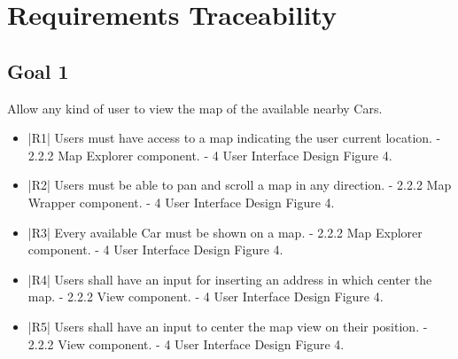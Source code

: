 \section{Requirements Traceability}

\subsection {Goal 1} Allow any kind of user to view the map of the available nearby Cars.
\begin{itemize}
 \item |R1| Users must have access to a map indicating the user current location.
    \newline - 2.2.2 Map Explorer component.
    \newline - 4 User Interface Design Figure 4.
 \item |R2| Users must be able to pan and scroll a map in any direction.
    \newline - 2.2.2 Map Wrapper component.
    \newline - 4 User Interface Design Figure 4.
 \item |R3| Every available Car must be shown on a map.
     \newline - 2.2.2 Map Explorer component.
     \newline - 4 User Interface Design Figure 4.
 \item |R4| Users shall have an input for inserting an address in which center the map.
    \newline - 2.2.2 View component.
    \newline - 4 User Interface Design Figure 4.
 \item |R5| Users shall have an input to center the map view on their position.
    \newline - 2.2.2 View component.
    \newline - 4 User Interface Design Figure 4.
\end{itemize}

